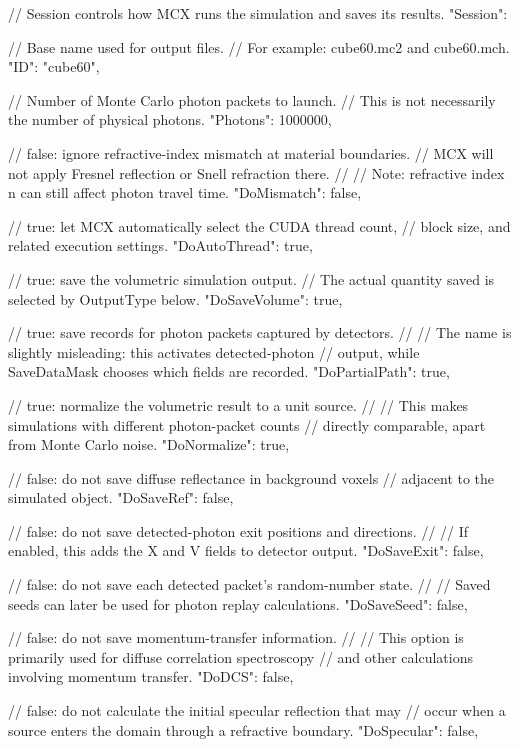 {
  // Session controls how MCX runs the simulation and saves its results.
  "Session": {

    // Base name used for output files.
    // For example: cube60.mc2 and cube60.mch.
    "ID": "cube60",

    // Number of Monte Carlo photon packets to launch.
    // This is not necessarily the number of physical photons.
    "Photons": 1000000,

    // false: ignore refractive-index mismatch at material boundaries.
    // MCX will not apply Fresnel reflection or Snell refraction there.
    //
    // Note: refractive index n can still affect photon travel time.
    "DoMismatch": false,

    // true: let MCX automatically select the CUDA thread count,
    // block size, and related execution settings.
    "DoAutoThread": true,

    // true: save the volumetric simulation output.
    // The actual quantity saved is selected by OutputType below.
    "DoSaveVolume": true,

    // true: save records for photon packets captured by detectors.
    //
    // The name is slightly misleading: this activates detected-photon
    // output, while SaveDataMask chooses which fields are recorded.
    "DoPartialPath": true,

    // true: normalize the volumetric result to a unit source.
    //
    // This makes simulations with different photon-packet counts
    // directly comparable, apart from Monte Carlo noise.
    "DoNormalize": true,

    // false: do not save diffuse reflectance in background voxels
    // adjacent to the simulated object.
    "DoSaveRef": false,

    // false: do not save detected-photon exit positions and directions.
    //
    // If enabled, this adds the X and V fields to detector output.
    "DoSaveExit": false,

    // false: do not save each detected packet's random-number state.
    //
    // Saved seeds can later be used for photon replay calculations.
    "DoSaveSeed": false,

    // false: do not save momentum-transfer information.
    //
    // This option is primarily used for diffuse correlation spectroscopy
    // and other calculations involving momentum transfer.
    "DoDCS": false,

    // false: do not calculate the initial specular reflection that may
    // occur when a source enters the domain through a refractive boundary.
    "DoSpecular": false,

}}
